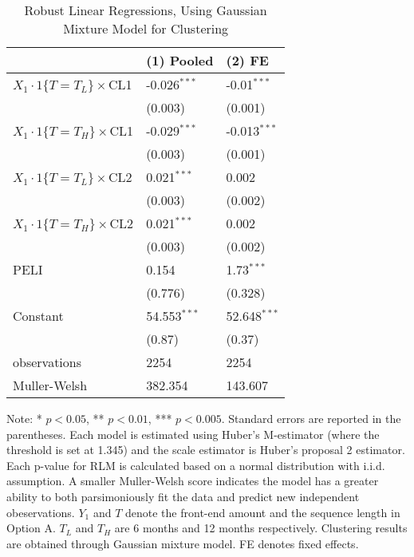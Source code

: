 \documentclass[12pt]{article}
\begin{document}
\begin{table}
    \caption{Robust Linear Regressions, Using Gaussian Mixture Model for Clustering}
    \vspace*{12pt}
    \centering

      \begin{tabular}{lll}
\hline
 & (1) Pooled & (2) FE \\
\hline
$X_1\cdot1\{T=T_L\}\times$CL1 & -0.026$^{***}$ & -0.01$^{***}$ \\
 & (0.003) & (0.001) \\
$X_1\cdot1\{T=T_H\}\times$CL1 & -0.029$^{***}$ & -0.013$^{***}$ \\
 & (0.003) & (0.001) \\
$X_1\cdot1\{T=T_L\}\times$CL2 & 0.021$^{***}$ & 0.002 \\
 & (0.003) & (0.002) \\
$X_1\cdot1\{T=T_H\}\times$CL2 & 0.021$^{***}$ & 0.002 \\
 & (0.003) & (0.002) \\
PELI & 0.154 & 1.73$^{***}$ \\
 & (0.776) & (0.328) \\
Constant & 54.553$^{***}$ & 52.648$^{***}$ \\
 & (0.87) & (0.37) \\\hline

observations & 2254 & 2254 \\
Muller-Welsh & 382.354 & 143.607 \\
\hline
\end{tabular}

    \vspace*{4pt}
    \centering
    \begin{minipage}{0.85\textwidth}
    {\par\footnotesize Note: * $p<0.05$, ** $p<0.01$, *** $p<0.005$. Standard errors are reported in the parentheses. Each model is estimated using Huber's M-estimator (where the threshold is set at 1.345) and the scale estimator is Huber's proposal 2 estimator. Each p-value for RLM is calculated based on a normal distribution with i.i.d. assumption. A smaller Muller-Welsh score indicates the model has a greater ability to both parsimoniously fit the data and predict new independent obeservations. $Y_1$ and $T$ denote the front-end amount and the sequence length in Option A. $T_L$ and $T_H$ are 6 months and 12 months respectively. Clustering results are obtained through Gaussian mixture model. FE denotes fixed effects.}
    \end{minipage}
    \label{tab:seq_value_rlm}
\end{table}
\end{document}
